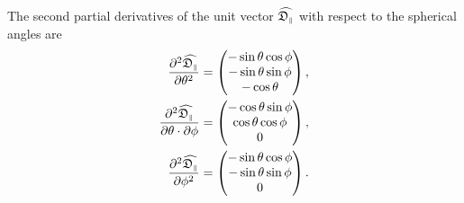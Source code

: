 The second partial derivatives of the unit vector $\widehat{\mathfrak{D}_{\scriptscriptstyle \parallel}}$ with respect to the spherical angles are
\begin{subequations}
\begin{align}
    \frac{\partial^2 \widehat{\mathfrak{D}_{\scriptscriptstyle \parallel}}}{\partial \theta^2} &= \begin{pmatrix}
        -\sin \theta \cos \phi \\
        -\sin \theta \sin \phi \\
        -\cos \theta \\
    \end{pmatrix}, \\
    \frac{\partial^2 \widehat{\mathfrak{D}_{\scriptscriptstyle \parallel}}}{\partial \theta \cdot \partial \phi} &= \begin{pmatrix}
        -\cos \theta \sin \phi \\
        \cos \theta \cos \phi \\
        0 \\
    \end{pmatrix}, \\
    \frac{\partial^2 \widehat{\mathfrak{D}_{\scriptscriptstyle \parallel}}}{\partial \phi^2} &= \begin{pmatrix}
        -\sin \theta \cos \phi \\
        -\sin \theta \sin \phi \\
        0 \\
    \end{pmatrix}.
\end{align}
\end{subequations}





